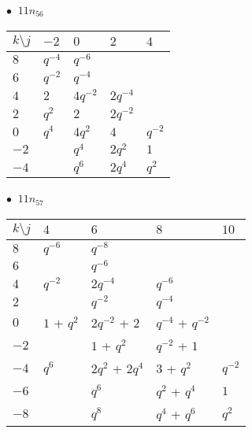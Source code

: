 %
\begin{minipage}{\linewidth}
$\bullet\ $ $11n_{56}$ \vspace{0.5em} \\
\begin{tabular}{l|llll}
$k \setminus j$ & $-2$ & $0$ & $2$ & $4$ \\
\hline
$8$ & $q^{-4}$ & $q^{-6}$ &  &  \\
$6$ & $q^{-2}$ & $q^{-4}$ &  &  \\
$4$ & $2$ & $4q^{-2}$ & $2q^{-4}$ &  \\
$2$ & $q^{2}$ & $2$ & $2q^{-2}$ &  \\
$0$ & $q^{4}$ & $4q^{2}$ & $4$ & $q^{-2}$ \\
$-2$ &  & $q^{4}$ & $2q^{2}$ & $1$ \\
$-4$ &  & $q^{6}$ & $2q^{4}$ & $q^{2}$ \\
\end{tabular}
\vspace{2em}
\end{minipage}
%
\begin{minipage}{\linewidth}
$\bullet\ $ $11n_{57}$ \vspace{0.5em} \\
\begin{tabular}{l|llll}
$k \setminus j$ & $4$ & $6$ & $8$ & $10$ \\
\hline
$8$ & $q^{-6}$ & $q^{-8}$ &  &  \\
$6$ &  & $q^{-6}$ &  &  \\
$4$ & $q^{-2}$ & $2q^{-4}$ & $q^{-6}$ &  \\
$2$ &  & $q^{-2}$ & $q^{-4}$ &  \\
$0$ & $1$ + $q^{2}$ & $2q^{-2}$ + $2$ & $q^{-4}$ + $q^{-2}$ &  \\
$-2$ &  & $1$ + $q^{2}$ & $q^{-2}$ + $1$ &  \\
$-4$ & $q^{6}$ & $2q^{2}$ + $2q^{4}$ & $3$ + $q^{2}$ & $q^{-2}$ \\
$-6$ &  & $q^{6}$ & $q^{2}$ + $q^{4}$ & $1$ \\
$-8$ &  & $q^{8}$ & $q^{4}$ + $q^{6}$ & $q^{2}$ \\
\end{tabular}
\vspace{2em}
\end{minipage}
%
